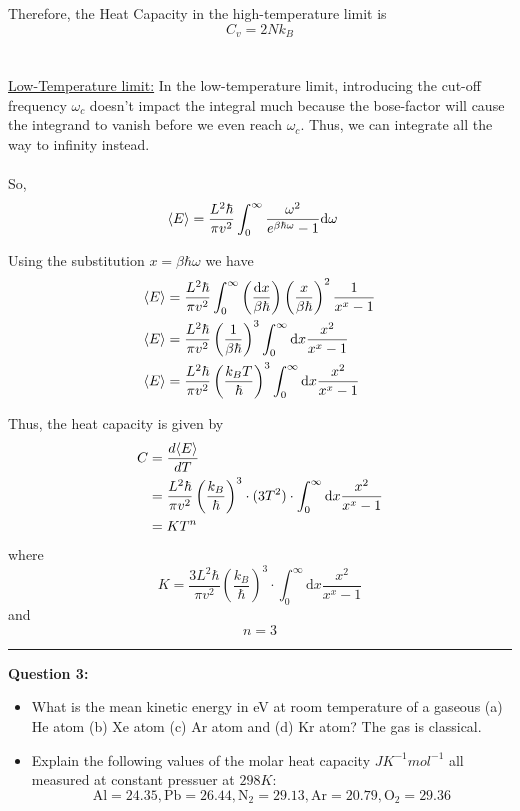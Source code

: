 \documentclass[11pt]{article}
\begin{document}
Therefore, the Heat Capacity in the high-temperature limit is $$ \boxed{C_v = 2N k_B} $$
\\
\\
\underline{Low-Temperature limit:}
In the low-temperature limit, introducing the cut-off frequency $\omega_c$ doesn't impact the integral much because the bose-factor will cause the integrand to vanish before we even reach $\omega_c$. Thus, we can integrate all the way to infinity instead.
\\
\\
So,
\begin{align*}
  \langle E \rangle &= \frac{L^2 \hbar}{\pi v^2} \int_{0}^{\infty} \frac{\omega^2}{e^{\beta \hbar \omega} - 1} \mathrm{d}\omega
\end{align*}

Using the substitution $x = \beta \hbar \omega$ we have 
\begin{align*}
  \langle E \rangle &= \frac{L^2 \hbar}{\pi v^2} \int_{0}^{\infty}  \left( \frac{\mathrm{d}x}{\beta \hbar} \right) \left( \frac{x}{\beta \hbar} \right)^2 \frac{1}{x^x - 1} \\
  \langle E \rangle &= \frac{L^2 \hbar}{\pi v^2} \left(\frac{1}{\beta \hbar}\right)^3 \int_{0}^{\infty}  \mathrm{d}x \frac{x^2}{x^x - 1} \\
  \langle E \rangle &= \frac{L^2 \hbar}{\pi v^2} \left(\frac{k_B T}{\hbar}\right)^3 \int_{0}^{\infty}  \mathrm{d}x \frac{x^2}{x^x - 1} \\
\end{align*}

Thus, the heat capacity is given by 
\begin{align*}
  C &= \frac{d\langle E \rangle}{dT} \\
  &= \frac{L^2 \hbar}{\pi v^2} \left(\frac{k_B}{\hbar}\right)^3 \cdot (3T^2) \cdot \int_{0}^{\infty}  \mathrm{d}x \frac{x^2}{x^x - 1} \\
  &= KT^n
\end{align*} where $$ \boxed{ K = \frac{3 L^2 \hbar}{\pi v^2} \left(\frac{k_B}{\hbar}\right)^3 \cdot \int_{0}^{\infty}  \mathrm{d}x \frac{x^2}{x^x - 1} } $$ and $$ \boxed{n = 3} $$


\vskip 0.5cm
\hrule
\pagebreak





\begin{bluebox}
  \textbf{Question 3:} 
  \begin{itemize}
    \item What is the mean kinetic energy in eV at room temperature of a gaseous (a) He atom (b) Xe atom (c) Ar atom and (d) Kr atom? The gas is classical.
    \item Explain the following values of the molar heat capacity $JK^{-1} mol^{-1}$ all measured at constant pressuer at $298 K$: $$ \mathrm{Al} = 24.35, \mathrm{Pb} = 26.44,  \mathrm{N}_2 = 29.13, \mathrm{Ar} = 20.79, \mathrm{O}_2 = 29.36 $$
  \end{itemize}
\end{bluebox}
\end{document}
